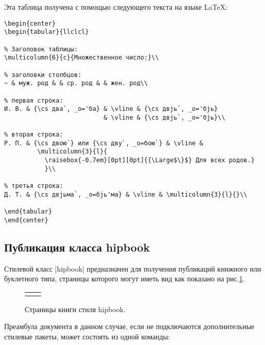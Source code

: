\documentclass{ltxguide}
\begin{document}
Эта таблица получена с помощью следующего текста на языке \LaTeX:

\begin{verbatim}
\begin{center}
\begin{tabular}{llclcl}

% Заголовок таблицы:
\multicolumn{6}{c}{Множественное число:}\\

% заголовки столбцов:
~ & муж. род & & ср. род & & жен. род\\

% первая строка:
И. В. & {\cs два`, _о='ба} & \vline & {\cs двjь`, _о='бjь} 
                           & \vline & {\cs двjь`, _о='бjь}\\

% вторая строка:
Р. П. & {\cs двою`} или {\cs дву`, _о=бою`} & \vline &
         \multicolumn{3}{l}{
           \raisebox{-0.7em}[0pt][0pt]{{\Large$\}$} Для всех родов.}
           }\\

% третья строка:
Д. Т. & {\cs двjьма`, _о=бjь'ма} & \vline & \multicolumn{3}{l}{}\\

\end{tabular}
\end{center}
\end{verbatim}

\subsection{Публикация класса hipbook}

Стилевой класс |hipbook| предназначен для получения публикаций
книжного или буклетного типа, страницы которого могут иметь вид как показано
на рис.\ref{pict1}.

\begin{center}
\begin{figure}[tbp]
\begin{tabular}[c]{cc}
      \fbox{
      \scalebox{0.6}{\includegraphics* [10, 370] [290, 800]{test20_1}}
      } &
      \fbox{
      \scalebox{0.6}{\includegraphics* [10, 370] [290, 800]{test20_2}}
      }
\end{tabular}
\caption{\label{pict1}Страницы книги стиля hipbook.}
\end{figure}
\end{center}

\baselineskip
Преамбула документа в данном случае, если не подключаются дополнительные
стилевые пакеты, может состоять из одной команды:
\end{document}
